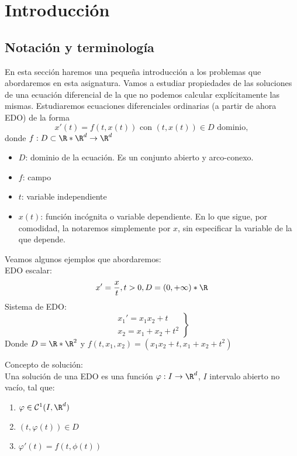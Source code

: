 \documentclass{article}
\begin{document}
\maketitle

\section{Introducción}

\subsection{Notación y terminología}

En esta sección haremos una pequeña introducción a los problemas que abordaremos
en esta asignatura. Vamos a estudiar propiedades de las soluciones de una ecuación
diferencial de la que no podemos calcular explícitamente las mismas. Estudiaremos
ecuaciones diferenciales ordinarias (a partir de ahora EDO) de la forma
\[x'(t) = f(t,x(t)) \text{ con } (t,x(t)) \in D \text{ dominio},\]
donde $f: D \subset \R*\R^d \to \R^d$

\begin{itemize}
    \item $D$: dominio de la ecuación. Es un conjunto abierto y arco-conexo.
    \item $f$: campo
    \item $t$: variable independiente
    \item $x(t)$: función incógnita o variable dependiente. En lo que sigue, por
    comodidad, la notaremos simplemente por $x$, sin especificar la variable de la
    que depende.
\end{itemize}

\begin{ex} Veamos algunos ejemplos que abordaremos:\\
    EDO escalar:
    $$ x' = \frac{x}{t}, t > 0, D = (0, +\infty)* \R$$
    Sistema de EDO:
    \[
    \left.
    \begin{array}{r}
        x_1' = x_1x_2 + t \\
        x_2 = x_1 + x_2 + t^2
    \end{array}
    \right\}
    \]
    Donde $D = \R * \R^2$ y $f(t, x_1, x_2) = (x_1x_2 + t, x_1 + x_2 + t^2)$
\end{ex}

\begin{definition} Concepto de solución:\\
    Una solución de una EDO es una función $\varphi: I \to \R^d$, $I$ intervalo
    abierto no vacío, tal que:
    \begin{enumerate}
        \item $\varphi \in \mathcal{C}^1(I, \R^d)$
        \item $(t, \varphi(t)) \in D$
        \item $\varphi'(t) = f(t, \phi(t))$
    \end{enumerate}

\end{definition}
\end{document}
